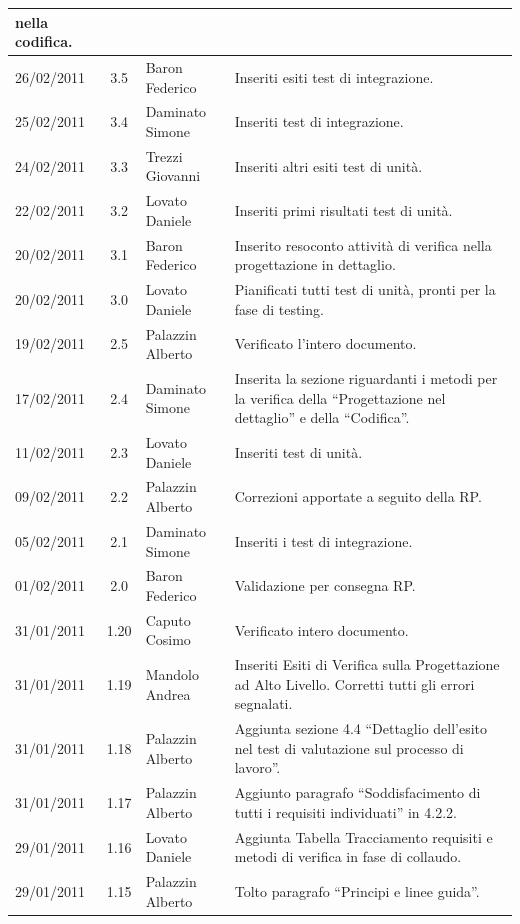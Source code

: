 \begin{longtable}{|p{}|c|p{}|p{}|}
nella codifica.\\
\hline
26/02/2011 & 3.5 & Baron Federico & Inseriti esiti test di integrazione.\\
\hline
25/02/2011 & 3.4 & Daminato Simone & Inseriti test di integrazione.\\
\hline
24/02/2011 & 3.3 & Trezzi Giovanni & Inseriti altri esiti test di unit\`a.\\
\hline
22/02/2011 & 3.2 & Lovato Daniele & Inseriti primi risultati test di unit\`a.\\
\hline
20/02/2011 & 3.1 & Baron Federico & Inserito resoconto attivit\`a di verifica
nella progettazione in dettaglio.\\
\hline
20/02/2011 & 3.0 & Lovato Daniele & Pianificati tutti test di unit\`a, pronti
per la fase di testing.\\
\hline
19/02/2011 & 2.5 & Palazzin Alberto & Verificato l'intero documento.\\
\hline
17/02/2011 & 2.4 & Daminato Simone & Inserita la sezione riguardanti i
metodi per la verifica della ``Progettazione nel dettaglio'' e
della ``Codifica''.\\
\hline
11/02/2011 & 2.3 & Lovato Daniele & Inseriti test di unit\`a.\\
\hline
09/02/2011 & 2.2 & Palazzin Alberto & Correzioni apportate a seguito della RP.\\
\hline
05/02/2011 & 2.1 & Daminato Simone & Inseriti i test di integrazione.\\
\hline
01/02/2011 & 2.0 & Baron Federico & Validazione per consegna RP.\\
\hline
31/01/2011 & 1.20 & Caputo Cosimo & Verificato intero documento.\\
\hline
31/01/2011 & 1.19 & Mandolo Andrea & Inseriti Esiti di Verifica sulla
Progettazione ad Alto Livello. Corretti tutti gli errori segnalati.\\
\hline
31/01/2011 & 1.18 & Palazzin Alberto & Aggiunta sezione 4.4 ``Dettaglio
dell'esito nel test di valutazione sul processo di lavoro''.\\
\hline
31/01/2011 & 1.17 & Palazzin Alberto & Aggiunto paragrafo ``Soddisfacimento di
tutti i requisiti individuati'' in 4.2.2.\\
\hline
29/01/2011 & 1.16 & Lovato Daniele & Aggiunta Tabella Tracciamento requisiti e
metodi di verifica in fase di collaudo.\\
\hline
29/01/2011 & 1.15 & Palazzin Alberto & Tolto paragrafo ``Principi e linee
guida''.\\

\end{longtable}
